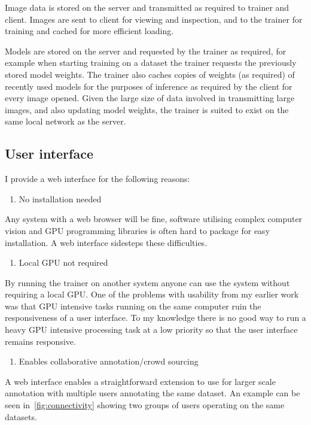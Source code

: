 Image data is stored on the server and transmitted as required to trainer and client. Images are sent to client for viewing and inspection, and to the trainer for training and cached for more efficient loading. 

Models are stored on the server and requested by the trainer as required, for example when starting training on a dataset the trainer requests the previously stored model weights. The trainer also caches copies of weights (as required) of recently used models for the purposes of inference as required by the client for every image opened. Given the large size of data involved in transmitting large images, and also updating model weights, the trainer is suited to exist on the same local network as the server. 



\subsection {User interface}

I provide a web interface for the following reasons:

\begin{enumerate}
    \item No installation needed
\end{enumerate}
Any system with a web browser will be fine, software utilising complex computer vision and GPU programming libraries is often hard to package for easy installation. A web interface sidesteps these difficulties.
\begin{enumerate}[resume]
    \item Local GPU not required
\end{enumerate}
By running the trainer on another system anyone can use the system without requiring a local GPU. One of the problems with usability from my earlier work was that GPU intensive tasks running on the same computer ruin the responsiveness of a user interface. To my knowledge there is no good way to run a heavy \gls{GPU} intensive processing task at a low priority so that the user interface remains responsive.
\begin{enumerate}[resume]
    \item Enables collaborative annotation/crowd sourcing
\end{enumerate}
A web interface enables a straightforward extension to use for larger scale annotation with multiple users annotating the same dataset. An example can be seen in~\ref{fig:connectivity} showing two groups of users operating on the same datasets.


